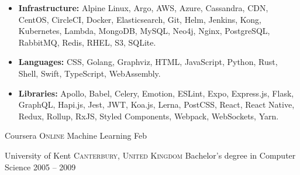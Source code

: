 \documentclass[10pt,a4paper]{article}
\begin{document}
\begin{indentsection}
\item
\begin{itemize}[leftmargin=0cm]

    \item \textbf{Infrastructure:} Alpine Linux, Argo, AWS, Azure, Cassandra, CDN, CentOS, CircleCI, Docker, Elasticsearch, Git, Helm, Jenkins, Kong, Kubernetes, Lambda, MongoDB, MySQL, Neo4j, Nginx, PostgreSQL, RabbitMQ, Redis, RHEL, S3, SQLite.
    \item \textbf{Languages:} CSS, Golang, Graphviz, HTML, JavaScript, Python, Rust, Shell, Swift, TypeScript, WebAssembly.
    \item \textbf{Libraries:} Apollo, Babel, Celery, Emotion, ESLint, Expo, Express.js, Flask, GraphQL, Hapi.js, Jest, JWT, Koa.js, Lerna, PostCSS, React, React Native, Redux, Rollup, RxJS, Styled Components, Webpack, WebSockets, Yarn.

\end{itemize}
\end{indentsection}

\spacedhrule{1.5em}{0em}


\headedsection
  {Coursera}
  {\textsc{Online}} {%
  \headedsubsection
    {Machine Learning}
    {Feb }
    {
  }
}

\headedsection
  {University of Kent}
  {\textsc{Canterbury, United Kingdom}} {%
  \headedsubsection
    {Bachelor's degree in Computer Science}
    {2005 -- 2009}
    {\bodytext{}
  }
}
\end{document}
